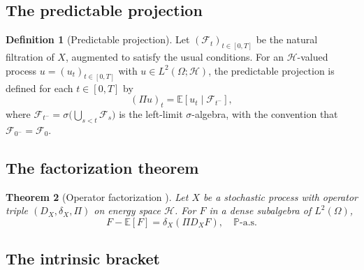 \documentclass[12pt]{article}
\theoremstyle{plain}
\newtheorem{theorem}{Theorem}[section]
\theoremstyle{definition}
\newtheorem{definition}[theorem]{Definition}
\theoremstyle{remark}
\newcommand{\E}{\mathbb{E}}
\newcommand{\F}{\mathcal{F}}
\newcommand{\PP}{\mathbb{P}}
\newcommand{\HH}{\mathcal{H}}
\begin{document}
\subsection{The predictable projection}

\begin{definition}[Predictable projection]\label{def:predictable-projection}
Let $(\F_t)_{t \in [0,T]}$ be the natural filtration of $X$, augmented to satisfy the usual conditions. For an $\HH$-valued process $u = (u_t)_{t \in [0,T]}$ with $u \in L^2(\Omega; \HH)$, the predictable projection is defined for each $t \in [0,T]$ by
\begin{equation}\label{eq:predictable-projection-def}
(\Pi u)_t = \E[u_t \mid \F_{t^-}],
\end{equation}
where $\F_{t^-} = \sigma\bigl(\bigcup_{s < t} \F_s\bigr)$ is the left-limit $\sigma$-algebra, with the convention that $\F_{0^-} = \F_0$.
\end{definition}

\subsection{The factorization theorem}

\begin{theorem}[Operator factorization {\cite{Fontes2026a}}]\label{thm:factorization}
Let $X$ be a stochastic process with operator triple $(D_X, \delta_X, \Pi)$ on energy space $\HH$. For $F$ in a dense subalgebra of $L^2(\Omega)$,
\begin{equation}\label{eq:factorization-thm}
F - \E[F] = \delta_X(\Pi D_X F), \quad \PP\text{-a.s.}
\end{equation}
\end{theorem}

\subsection{The intrinsic bracket}
\end{document}

